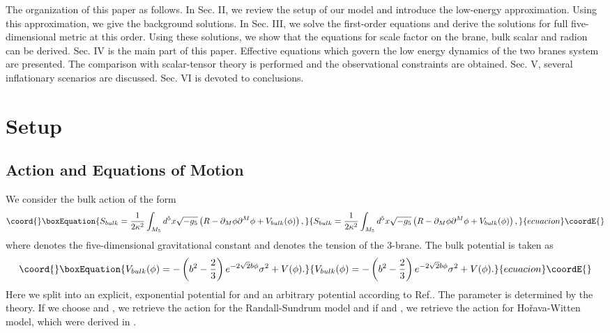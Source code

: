 \documentclass[a4paper,11pt]{article}
\begin{document}
The organization of this paper as follows. In Sec. II, we review the setup 
of our model and introduce the low-energy approximation. Using 
this approximation, we give the background solutions.  
In Sec. III, we solve the first-order equations and derive  
the solutions for full five-dimensional metric at this order.
Using these solutions, we show that 
the equations for scale factor on the brane, bulk scalar
and radion can be derived. 
Sec. IV is the main part of this paper. Effective equations 
which govern the low energy dynamics of the two branes system
are presented. The comparison with scalar-tensor theory 
is performed and the observational constraints are obtained.  
Sec. V, several inflationary scenarios are discussed.
Sec. VI is devoted to conclusions. 


\section{Setup}

\subsection{Action and Equations of Motion}

We consider the bulk action of the form
\begin{equation}\coord{}\boxEquation{
S_{bulk} = \frac{1}{2\kappa^2}\int_{M_5} d^5 x \sqrt{-g_5}
\left(R-\partial_M \phi \partial^M \phi + V_{bulk}(\phi) \right),
}{
S_{bulk} = \frac{1}{2\kappa^2}\int_{M_5} d^5 x \sqrt{-g_5}
\left(R-\partial_M \phi \partial^M \phi + V_{bulk}(\phi) \right),
}{ecuacion}\coordE{}\end{equation} 
where \coordHE{} denotes the five-dimensional gravitational constant 
and \myHighlight{$\sigma$}\coordHE{} denotes the tension of the 3-brane.
The bulk potential is taken as 
\begin{equation}\coord{}\boxEquation{
V_{bulk}(\phi) = -\left(b^2 -\frac{2}{3}\right)
e^{-2\sqrt{2}b \phi} \sigma^2 +V(\phi). 
}{
V_{bulk}(\phi) = -\left(b^2 -\frac{2}{3}\right)
e^{-2\sqrt{2}b \phi} \sigma^2 +V(\phi). 
}{ecuacion}\coordE{}\end{equation} 
Here we split \coordHE{} into an explicit, exponential potential 
for \myHighlight{$\phi$}\coordHE{} and an arbitrary potential \coordHE{} according to 
Ref.\cite{LOW}. 
The parameter \coordHE{} is determined by the theory.  
If we choose \coordHE{} and \coordHE{}, we retrieve the 
action for the Randall-Sundrum model and if \coordHE{} and \coordHE{}, 
we retrieve the action for Ho\v{r}ava-Witten model, 
which were derived in \cite{Lukas1}.
\end{document}
